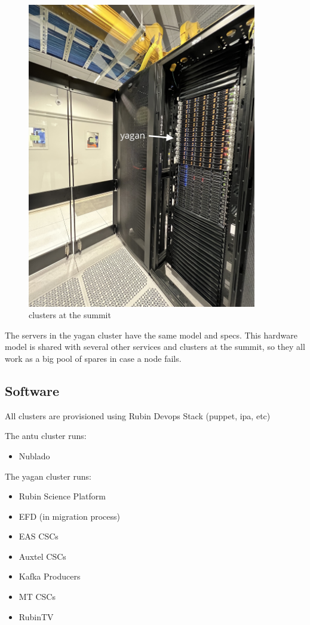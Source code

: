\begin{figure}
    \centering
    \includegraphics[width=10cm]{images/yagan.jpg}
    \caption{clusters at the summit}
\end{figure}

The servers in the yagan cluster have the same model and specs. This hardware model is shared with several other services and clusters at the summit, so they all work as a big pool of spares in case a node fails.  

\newpage

\subsection{Software}

All clusters are provisioned using  Rubin Devops Stack (puppet, ipa, etc)

The antu cluster runs:
\begin{itemize}
    \item Nublado
\end{itemize}

The yagan cluster runs: 
\begin{itemize}
    \item Rubin Science Platform
    \item EFD (in migration process)
    \item EAS CSCs
    \item Auxtel CSCs
    \item Kafka Producers 
    \item MT CSCs
    \item RubinTV
\end{itemize}

